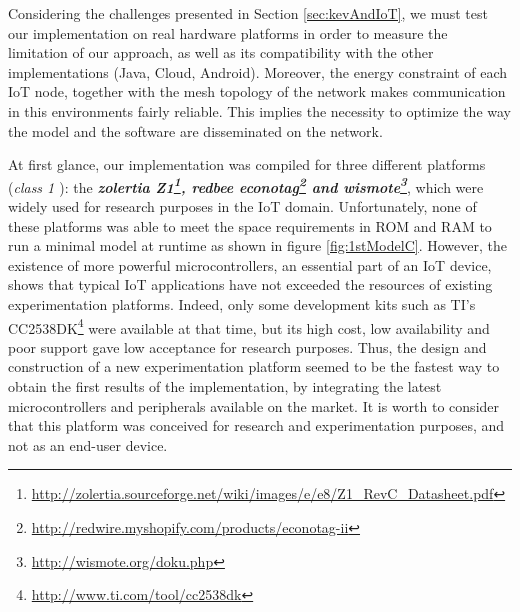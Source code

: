 Considering the challenges presented in Section \ref{sec:kevAndIoT}, we must test our implementation on real hardware platforms in order to measure the limitation of our approach, as well as its compatibility with the other implementations (Java, Cloud, Android).
Moreover, the energy constraint of each IoT node, together with the mesh topology of the network makes communication in this environments fairly reliable.
This implies the necessity to optimize the way the model and the software are disseminated on the network.

At first glance, our implementation was compiled for three different platforms (\textit{class 1 \cite{rfc7228}}): the \textit{\textbf{zolertia Z1\footnote{\url{http://zolertia.sourceforge.net/wiki/images/e/e8/Z1_RevC_Datasheet.pdf}}, redbee econotag\footnote{\url{http://redwire.myshopify.com/products/econotag-ii}} and wismote\footnote{\url{http://wismote.org/doku.php}}}}, which were widely used for research purposes in the IoT domain.
Unfortunately, none of these platforms was able to meet the space requirements in ROM and RAM to run a minimal model at runtime as shown in figure \ref{fig:1stModelC}.
However, the existence of more powerful microcontrollers, an essential part of an IoT device, shows that typical IoT applications have not exceeded the resources of existing experimentation platforms.
Indeed, only some development kits such as TI's CC2538DK\footnote{\url{http://www.ti.com/tool/cc2538dk}} were available at that time, but its high cost, low availability and poor support gave low acceptance for research purposes.
Thus, the design and construction of a new experimentation platform seemed to be the fastest way to obtain the first results of the implementation, by integrating the latest microcontrollers and peripherals available on the market.
It is worth to consider that this platform was conceived for research and experimentation purposes, and not as an end-user device.


